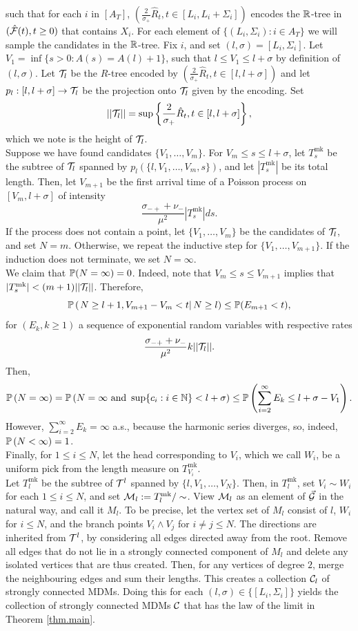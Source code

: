 such that for each $i$ in $\left[A_T\right]$, $\left(\frac{2}{\sigma_+}\hat{R}_t,t\in [L_i,L_i+\Sigma_i]\right)$ encodes the $\R$-tree in $(\hat{\cF}(t),t\geq 0)$ that contains $X_i$. For each element of $\{(L_i,\Sigma_i):i\in A_T\}$ we will sample the candidates in the $\R$-tree. Fix $i$, and set $(l,\sigma)=[L_i,\Sigma_i]$. Let $V_1=\inf\{s>0:A(s)=A(l)+1\}$, such that $l\leq V_1\leq l+\sigma$ by definition of $(l,\sigma)$. Let $\cT_l$ be the $R$-tree encoded by $\left(\frac{2}{\sigma_+}\hat{R}_t,t\in [l,l+\sigma]\right)$ and let $p_l:[l,l+\sigma]\to \cT_l$ be the projection onto $\cT_l$ given by the encoding. Set $$||\cT_l||=\sup\left\{\frac{2}{\sigma_+}\hat{R}_t,t\in [l,l+\sigma]\right\},$$
which we note is the height of $\cT_l$. \\
Suppose we have found candidates $\{V_1,\dots,V_m\}$. For $V_m\leq s\leq l+\sigma$, let $T^{\text{mk}}_s$ be the subtree of $\cT_l$ spanned by $p_l\left(\{l,V_1,\dots,V_m,s\}\right)$, and let $|T^{\text{mk}}_s|$ be its total length. Then, let $V_{m+1}$ be the first arrival time of a Poisson process on $[V_m,l+\sigma]$ of intensity $$\frac{\sigma_{-+}+\nu_-}{\mu^2}|T^{\text{mk}}_s|ds.$$ If the process does not contain a point, let $\{V_1,\dots,V_m\}$ be the candidates of $\cT_l$, and set $N=m$. Otherwise, we repeat the inductive step for $\{V_1,\dots,V_{m+1}\}.$ If the induction does not terminate, we set $N=\infty$.\\
We claim that $\P(N=\infty)=0$. Indeed, note that $V_m\leq s\leq V_{m+1}$ implies that  $|T^{\text{mk}}_s|<(m+1)||\cT_l||$. Therefore, 
$$\P\left(\left.N\geq l+1,V_{m+1}-V_m<t \right|N\geq l\right)\leq \P(E_{m+1}<t),$$
for $(E_{k},k\geq 1)$ a sequence of exponential random variables with respective rates $$\frac{\sigma_{-+}+\nu_-}{\mu^2}k||\cT_l||.$$ 
Then,
$$\P\left(N=\infty \right)=\P\left(N=\infty\text{ and }\sup\{c_i:i\in \N\}<l+\sigma\right)\leq \P\left(\sum_{i=2}^\infty E_k\leq l+\sigma-V_1\right).$$
However, $\sum_{i=2}^\infty E_k=\infty$ a.s., because the harmonic series diverges, so, indeed, $\P\left(N<\infty \right)=1$. \\
Finally, for $1\leq i \leq N$, let the head corresponding to $V_i$, which we call $W_i$, be a uniform pick from the length measure on $T^{\text{mk}}_{V_i}$. \\
Let $T^{\text{mk}}_l$ be the subtree of $\cT^{l}$ spanned by $\{l,V_1,\dots,V_N\}$. Then, in $T^{\text{mk}}_{l}$, set $V_i\sim W_i$ for each $1\leq i\leq N$, and set $\cM_{l}:=T^{\text{mk}}_{l}/\sim$. View $\cM_{l}$ as an element of $\vec{\cG}$ in the natural way, and call it $M_l$. To be precise,  let the vertex set of $M_l$ consist of $l$, $W_i$ for $i\leq N$, and the branch points $V_i\wedge V_j$ for $i\neq j\leq N$. The directions are inherited from $\cT^l$, by considering all edges directed away from the root. Remove all edges that do not lie in a strongly connected component of $M_{l}$ and delete any isolated vertices that are thus created. Then, for any vertices of degree $2$, merge the neighbouring edges and sum their lengths. This creates a collection $\cC_l$ of strongly connected MDMs. Doing this for each $(l,\sigma)\in \{[L_i,\Sigma_i]\}$ yields the collection of strongly connected MDMs $\cC$ that has the law of the limit in Theorem \ref{thm.main}.

